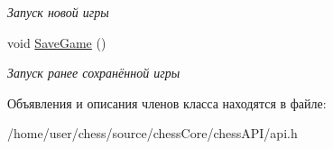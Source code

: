\begin{DoxyCompactItemize}
\begin{DoxyCompactList}\small\item\em Запуск новой игры \end{DoxyCompactList}\item 
\hypertarget{classAPI_aa9c60516d733f42bbb67bf4efe4a67b8}{void \hyperlink{classAPI_aa9c60516d733f42bbb67bf4efe4a67b8}{Save\+Game} ()}\label{classAPI_aa9c60516d733f42bbb67bf4efe4a67b8}

\begin{DoxyCompactList}\small\item\em Запуск ранее сохранённой игры \end{DoxyCompactList}\end{DoxyCompactItemize}


Объявления и описания членов класса находятся в файле\+:\begin{DoxyCompactItemize}
\item 
/home/user/chess/source/chess\+Core/chess\+A\+P\+I/api.\+h\end{DoxyCompactItemize}
